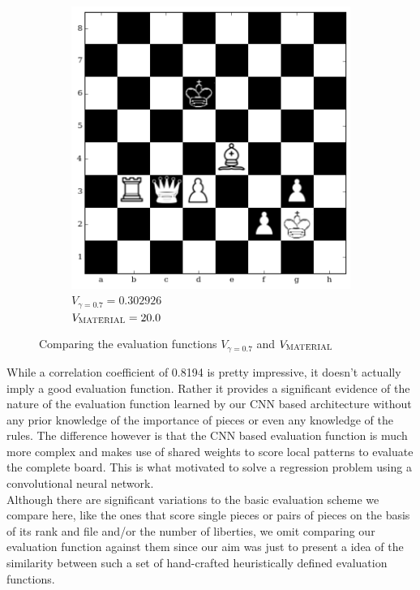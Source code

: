 \begin{figure}[h]
\begin{subfigure}[t]{0.45\textwidth}
    \includegraphics[width=\textwidth]{img/table_evaluations/output_36_0.png}
         \caption{$V_{\gamma=0.7} = 0.302926$\\  
$V_{\textsc{MATERIAL}}= 20.0 $}
    \label{figure:correlation2d}
    \end{subfigure}
    \caption{Comparing the evaluation functions $V_{\gamma=0.7}$ and 
$V_{\textsc{MATERIAL}}$ }
\label{figure:correlation2}
\end{figure}


While a correlation coefficient of 0.8194 is pretty impressive, it doesn't 
actually imply a good evaluation function. Rather it provides a significant 
evidence of the nature of the evaluation function learned by our CNN based 
architecture without any prior knowledge of the importance of pieces or even any 
knowledge of the rules. The difference however is that the CNN based evaluation 
function is much more complex and makes use of shared weights to score local 
patterns to evaluate the complete board. This is what motivated to solve a 
regression problem using a convolutional neural network.\\

Although there are significant variations to the basic evaluation scheme we 
compare here, like the ones that score single pieces or pairs of pieces on the 
basis of its rank and file and/or the number of liberties, we omit comparing 
our evaluation function against them since our aim was just to present a idea of 
the similarity between such a set of hand-crafted heuristically defined 
evaluation functions.


